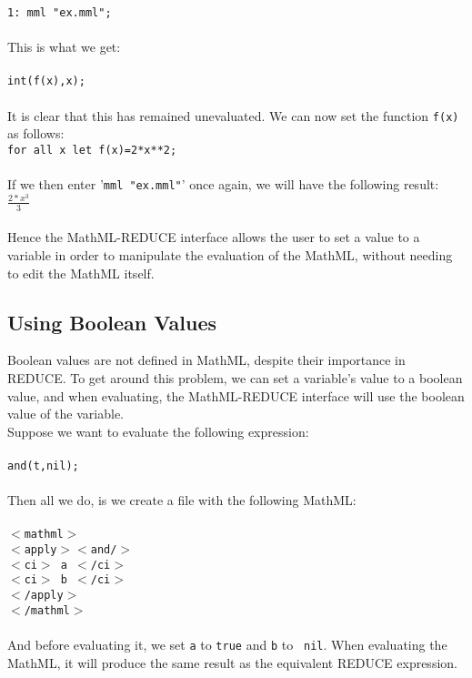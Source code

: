 \documentclass{article}
\begin{document}
{\tt 1: mml "ex.mml";}\\
\\
This is what we get:
\\
\\
{\tt int(f(x),x);}\\
\\
It is clear that this has remained unevaluated. We can now set the function
{\tt f(x)} as follows:\\

{\tt for all x let f(x)=2*x**2;}\\
\\
If we then enter '{\tt mml "ex.mml"}' once again, we will have the
following result:\\

{\Large \( \frac {2*x^{3}}{3}\)}
\\
\\
Hence the MathML-REDUCE interface allows the user to set a value to a
variable in order to manipulate the evaluation of the MathML, without needing
to edit the MathML itself.

\subsection{Using Boolean Values}

Boolean values are not defined in MathML, despite their importance in REDUCE.
To get around this problem, we can set a variable's value to a boolean value,
and when evaluating, the MathML-REDUCE interface will use the boolean value
of the variable.
\\
Suppose we want to evaluate the following expression:
\\
\\
{\tt and(t,nil);}
\\
\\
Then all we do, is we create a file with the following MathML:
\\
\\
{\tt          $<$mathml$>$\\
\hspace*{2mm} $<$apply$>$$<$and/$>$\\
\hspace*{5mm}         $<$ci$>$ a $<$/ci$>$\\
\hspace*{5mm}         $<$ci$>$ b $<$/ci$>$\\
\hspace*{2mm}      $<$/apply$>$\\
        $<$/mathml$>$\\}
\\
And before evaluating it, we set {\tt a} to {\tt true} and {\tt b} to {\tt
nil}. When evaluating the MathML, it will produce the same result as the
equivalent REDUCE expression.
\end{document}
